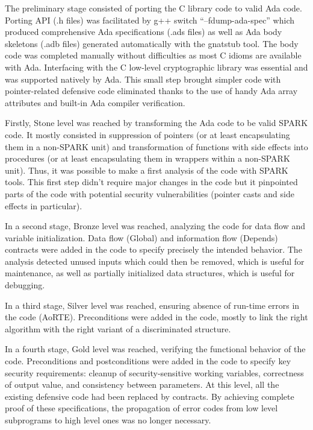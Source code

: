 \documentclass{llncs}
\begin{document}
The preliminary stage consisted of porting the C library code to valid Ada
code. Porting API (.h files) was facilitated by g++ switch ``–fdump-ada-spec''
which produced comprehensive Ada specifications (.ads files) as well as Ada
body skeletons (.adb files) generated automatically with the gnatstub tool. The
body code was completed manually without difficulties as most C idioms are
available with Ada. Interfacing with the C low-level cryptographic library was
essential and was supported natively by Ada. This small step brought
simpler code with pointer-related defensive code eliminated thanks to the use
of handy Ada array attributes and built-in Ada compiler verification.

Firstly, Stone level was reached by transforming the Ada code to be valid SPARK
code. It mostly consisted in suppression of pointers (or at least encapsulating
them in a non-SPARK unit) and transformation of functions with side effects
into procedures (or at least encapsulating them in wrappers within a non-SPARK
unit). Thus, it was possible to make a first analysis of the code with SPARK
tools. This first step didn't require major changes in the code but it
pinpointed parts of the code with potential security vulnerabilities
(pointer casts and side effects in particular).

In a second stage, Bronze level was reached, analyzing the code for data flow
and variable initialization. Data flow (Global) and information flow (Depends)
contracts were added in the code to specify precisely the intended
behavior. The analysis detected unused inputs which could then be removed,
which is useful for maintenance, as well as partially initialized data
structures, which is useful for debugging.

In a third stage, Silver level was reached, ensuring absence of run-time errors
in the code (AoRTE). Preconditions were added in the code, mostly to link the
right algorithm with the right variant of a discriminated structure.

In a fourth stage, Gold level was reached, verifying the functional behavior of
the code.  Preconditions and postconditions were added in the code to specify key
security requirements: cleanup of security-sensitive working variables,
correctness of output value, and consistency between parameters. At this level, all
the existing defensive code had been replaced by contracts. By achieving
complete proof of these specifications, the propagation of error codes from low
level subprograms to high level ones was no longer necessary.
\end{document}
